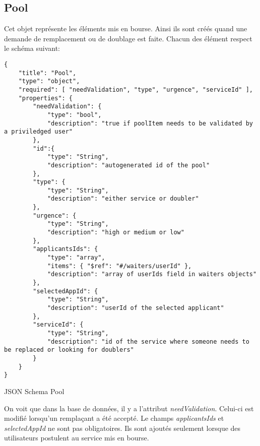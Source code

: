 \subsection*{Pool}
Cet objet représente les éléments mis en bourse. Ainsi ils sont créés quand une demande de remplacement ou de doublage est faite. Chacun des élément respect le schéma suivant:
\begin{listing}[!h]
\begin{verbatim}
{
    "title": "Pool",
    "type": "object",
    "required": [ "needValidation", "type", "urgence", "serviceId" ],
    "properties": {
        "needValidation": {
            "type": "bool",
            "description": "true if poolItem needs to be validated by a priviledged user"
        },
        "id":{
            "type": "String",
            "description": "autogenerated id of the pool"
        },
        "type": {
            "type": "String",
            "description": "either service or doubler"
        },
        "urgence": {
            "type": "String",
            "description": "high or medium or low"
        },
        "applicantsIds": {
            "type": "array",
            "items": { "$ref": "#/waiters/userId" },
            "description": "array of userIds field in waiters objects"
        },
        "selectedAppId": {
            "type": "String",
            "description": "userId of the selected applicant"
        },
        "serviceId": {
            "type": "String",
            "description": "id of the service where someone needs to be replaced or looking for doublers"
        }
    }
}
\end{verbatim}
\caption{JSON Schema Pool}
\label{schema:services}
\end{listing}

On voit que dans la base de données, il y a l'attribut \textit{needValidation}. Celui-ci est modifié lorsqu'un remplaçant a été accepté. Le champs \textit{applicantsIds} et \textit{selectedAppId} ne sont pas obligatoires. Ils sont ajoutés seulement lorsque des utilisateurs postulent au service mis en bourse.

